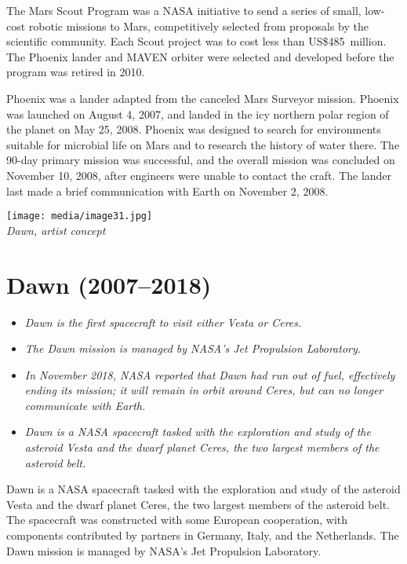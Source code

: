 The Mars Scout Program was a NASA initiative to send a series of small,
low-cost robotic missions to Mars, competitively selected from proposals
by the scientific community. Each Scout project was to cost less than
US\$485~million. The Phoenix lander and MAVEN orbiter were selected and
developed before the program was retired in 2010.

Phoenix was a lander adapted from the canceled Mars Surveyor mission.
Phoenix was launched on August 4, 2007, and landed in the icy northern
polar region of the planet on May 25, 2008. Phoenix was designed to
search for environments suitable for microbial life on Mars and to
research the history of water there. The 90-day primary mission was
successful, and the overall mission was concluded on November 10, 2008,
after engineers were unable to contact the craft. The lander last made a
brief communication with Earth on November 2, 2008.

\texttt{[image: media/image31.jpg]}\\
\emph{Dawn, artist concept}

\section{Dawn (2007--2018)}\label{dawn-20072018}

\begin{itemize}
\item
  \emph{Dawn is the first spacecraft to visit either Vesta or Ceres.}
\item
  \emph{The Dawn mission is managed by NASA's Jet Propulsion
  Laboratory.}
\item
  \emph{In November 2018, NASA reported that Dawn had run out of fuel,
  effectively ending its mission; it will remain in orbit around Ceres,
  but can no longer communicate with Earth.}
\item
  \emph{Dawn is a NASA spacecraft tasked with the exploration and study
  of the asteroid Vesta and the dwarf planet Ceres, the two largest
  members of the asteroid belt.}
\end{itemize}

Dawn is a NASA spacecraft tasked with the exploration and study of the
asteroid Vesta and the dwarf planet Ceres, the two largest members of
the asteroid belt. The spacecraft was constructed with some European
cooperation, with components contributed by partners in Germany, Italy,
and the Netherlands. The Dawn mission is managed by NASA's Jet
Propulsion Laboratory.

